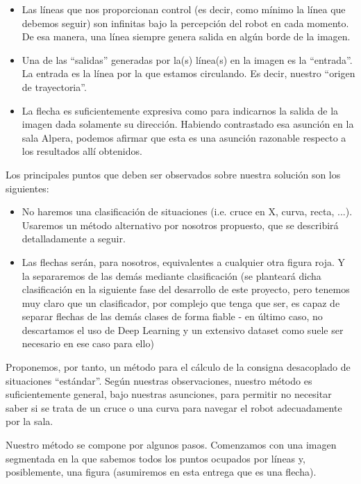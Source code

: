 \documentclass{article}
\begin{document}
    \begin{itemize}
        \item Las líneas que nos proporcionan control (es decir, como mínimo la línea que debemos seguir) son infinitas bajo la percepción del robot en cada momento. De esa manera, una línea siempre genera salida en algún borde de la imagen.
        \item Una de las ``salidas'' generadas por la(s) línea(s) en la imagen es la ``entrada''. La entrada es la línea por la que estamos circulando. Es decir, nuestro ``origen de trayectoria''.
        \item La flecha es suficientemente expresiva como para indicarnos la salida de la imagen dada solamente su dirección. Habiendo contrastado esa asunción en la sala Alpera, podemos afirmar que esta es una asunción razonable respecto a los resultados allí obtenidos.
    \end{itemize}

    Los principales puntos que deben ser observados sobre nuestra solución son los siguientes:
    \begin{itemize}
        \item No haremos una clasificación de situaciones (i.e. cruce en X, curva, recta, ...). Usaremos un método alternativo por nosotros propuesto, que se describirá detalladamente a seguir.
        \item Las flechas serán, para nosotros, equivalentes a cualquier otra figura roja. Y la separaremos de las demás mediante clasificación (se planteará dicha clasificación en la siguiente fase del desarrollo de este proyecto, pero tenemos muy claro que un clasificador, por complejo que tenga que ser, es capaz de separar flechas de las demás clases de forma fiable - en último caso, no descartamos el uso de Deep Learning y un extensivo dataset como suele ser necesario en ese caso para ello)
    \end{itemize}

    Proponemos, por tanto, un método para el cálculo de la consigna desacoplado de situaciones ``estándar''. Según nuestras observaciones, nuestro método es suficientemente general, bajo nuestras asunciones, para permitir no necesitar saber si se trata de un cruce o una curva para navegar el robot adecuadamente por la sala.

    Nuestro método se compone por algunos pasos. Comenzamos con una imagen segmentada en la que sabemos todos los puntos ocupados por líneas y, posiblemente, una figura (asumiremos en esta entrega que es una flecha).
\end{document}

